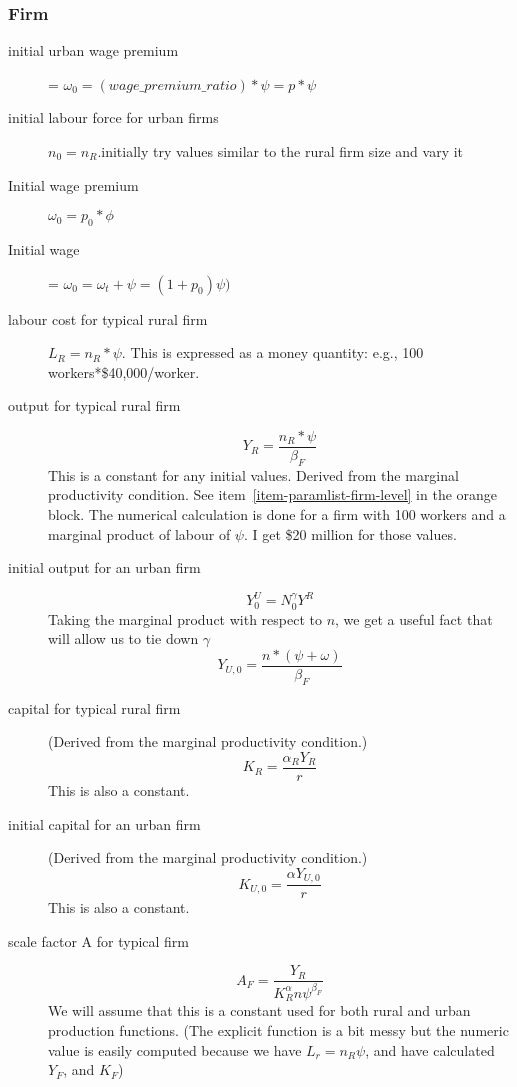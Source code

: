 \subsubsection{Firm}
\begin{description}

\item[initial urban wage premium] = $\omega_0 = (wage\_premium\_ratio) * \psi = p*\psi $

\item[initial labour force for urban firms] $n_0=n_R$.initially try values similar to the rural firm size and vary it  %
\item[Initial wage premium] $\omega_0=p_0*\phi$
\item[Initial wage] = $\omega_0=\omega_t +\psi =(1+p_0)\psi)$

\item[labour cost for typical rural firm] $L_R = n_R*\psi$. This is expressed as a money quantity: e.g., 100 workers*\$40,000/worker.  


\item[output for typical rural firm]  
\[Y_R=\frac{n_R*\psi}{\beta_F}\]
This is a constant for any initial values. Derived from the marginal productivity condition. See item~\ref{item-paramlist-firm-level} in the orange  block. The numerical calculation is done  for a firm with 100 workers and a marginal product of labour of $\psi$. I get \$20 million for those values. 


\item[initial output for an urban firm] 
\[Y_0^U=N_0^\gamma Y^R\]  
Taking the marginal product with respect to $n$, we get a useful fact that will allow us to tie down $\gamma$
\[Y_{U,0}=\frac{n*(\psi+\omega)}{\beta_F}\]

\item[capital for typical rural firm] (Derived from the marginal productivity condition.)
\[K_R=  \frac{\alpha_R Y_R }{r}\]
This is also a constant.
 
\item[initial capital for an urban firm] (Derived from the marginal productivity condition.)
\[K_{U,0}=  \frac{\alpha Y_{U,0} }{r}\]
This is also a constant.

\item[scale factor A for typical  firm] 
\[A_F= \frac{Y_R}{K_R^{\alpha} {n\psi}^{\beta_F}}\]
We will assume that this is a constant used for both rural and urban production functions. (The explicit function is a bit  messy but the numeric value is easily computed because we have $L_r=n_R\psi$, and have calculated $Y_F$, and  $K_F$)

\end{description}

